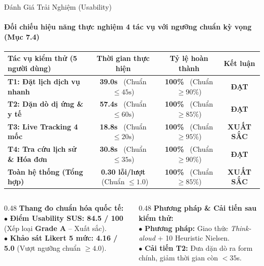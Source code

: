 \begin{frame}{Đánh Giá Trải Nghiệm (Usability)}
  \framesubtitle{\color{white!90}\textbf{Đối chiếu hiệu năng thực nghiệm 4 tác vụ với ngưỡng chuẩn kỳ vọng (Mục 7.4)}}

  {\small
  \begin{tabularx}{\textwidth}{X c c c}
    \toprule
    \rowcolor{PetcarePrimary!12}
    \textbf{Tác vụ kiểm thử (5 người dùng)} & \textbf{Thời gian thực hiện} & \textbf{Tỷ lệ hoàn thành} & \textbf{Kết luận} \\
    \midrule
    \textbf{T1: Đặt lịch dịch vụ nhanh} & \textbf{39.0s} \ (Chuẩn $\le 45\text{s}$) & \textbf{100\%} \ (Chuẩn $\ge 90\%$) & \textbf{\color{PetcarePrimary}ĐẠT} \\
    \textbf{T2: Dặn dò dị ứng \& y tế} & \textbf{57.4s} \ (Chuẩn $\le 60\text{s}$) & \textbf{100\%} \ (Chuẩn $\ge 85\%$) & \textbf{\color{PetcarePrimary}ĐẠT} \\
    \textbf{T3: Live Tracking 4 mốc} & \textbf{18.8s} \ (Chuẩn $\le 20\text{s}$) & \textbf{100\%} \ (Chuẩn $\ge 95\%$) & \textbf{\color{PetcarePrimary}XUẤT SẮC} \\
    \textbf{T4: Tra cứu lịch sử \& Hóa đơn} & \textbf{30.8s} \ (Chuẩn $\le 35\text{s}$) & \textbf{100\%} \ (Chuẩn $\ge 90\%$) & \textbf{\color{PetcarePrimary}ĐẠT} \\
    \midrule
    \rowcolor{PetcarePrimary!8}
    \textbf{Toàn hệ thống (Tổng hợp)} & \textbf{0.30 lỗi/lượt} \ (Chuẩn $\le 1.0$) & \textbf{100\%} \ (Chuẩn $\ge 85\%$) & \textbf{\color{PetcarePrimary}XUẤT SẮC} \\
    \bottomrule
  \end{tabularx}}

  \vspace{2mm}
  \begin{columns}[T]
    \begin{column}{0.48\textwidth}
      {\color{PetcarePrimary}\textbf{\small Thang đo chuẩn hóa quốc tế:}}\\[1.5mm]
      \small
      $\bullet$ \textbf{Điểm Usability SUS: 84.5 / 100} (Xếp loại \textbf{Grade A} -- Xuất sắc).\\
      $\bullet$ \textbf{Khảo sát Likert 5 mức: 4.16 / 5.0} (Vượt ngưỡng chuẩn $\ge 4.0$).
    \end{column}

    \begin{column}{0.48\textwidth}
      {\color{PetcarePrimary}\textbf{\small Phương pháp \& Cải tiến sau kiểm thử:}}\\[1.5mm]
      \small
      $\bullet$ \textbf{Phương pháp:} Giao thức \textit{Think-aloud} + 10 Heuristic Nielsen.\\
      $\bullet$ \textbf{Cải tiến T2:} Đưa dặn dò ra form chính, giảm thời gian còn $< 35$s.
    \end{column}
  \end{columns}
\end{frame}
